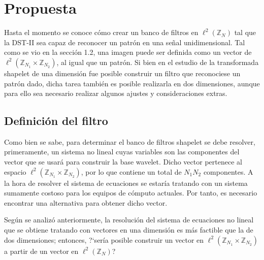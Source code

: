 \chapter{Propuesta}\label{chapter:proposal}

\par Hasta el momento se conoce c\'omo crear un banco de filtros en $\ell^2(\mathbb{Z}_N)$ tal que la DST-II sea capaz de reconocer un patr\'on en una se\~nal unidimensional. Tal como se vio en la secci\'on 1.2, una imagen puede ser definida como un vector de $\ell^2(\mathbb{Z}_{N_1}\times\mathbb{Z}_{N_2})$, al igual que un patr\'on. Si bien en el estudio de la transformada shapelet de una dimensi\'on fue posible construir un filtro que reconociese un patr\'on dado, dicha tarea tambi\'en es posible realizarla en dos dimensiones, aunque para ello sea necesario realizar algunos ajustes y consideraciones extras.\\

\section{Definici\'on del filtro}

\par Como bien se sabe, para determinar el banco de filtros shapelet se debe resolver, primeramente, un sistema no lineal cuyas variables son las componentes del vector que se usar\'a para construir la base wavelet. Dicho vector pertenece al espacio $\ell^2(\mathbb{Z}_{N_1}\times\mathbb{Z}_{N_2})$, por lo que contiene un total de $N_1N_2$ componentes. A la hora de resolver el sistema de ecuaciones se estar\'ia tratando con un sistema sumamente costoso para los equipos de c\'omputo actuales. Por tanto, es necesario encontrar una alternativa para obtener dicho vector.\\

\par Seg\'un se analiz\'o anteriormente, la resoluci\'on del sistema de ecuaciones no lineal que se obtiene tratando con vectores en una dimensi\'on es m\'as factible que la de dos dimensiones; entonces, ?`ser\'ia posible construir un vector en $\ell^2(\mathbb{Z}_{N_1}\times\mathbb{Z}_{N_2})$ a partir de un vector en $\ell^2(\mathbb{Z}_N)$?

